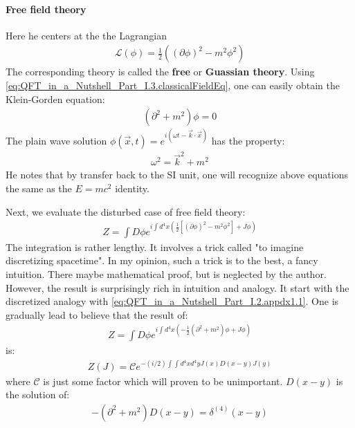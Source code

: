 \documentclass{book}
\numberwithin{equation}{subsection} %
\theoremstyle{definition}
\begin{document}
\paragraph{Free field theory}

Here he centers at the the Lagrangian
\begin{align}
    \mathcal{L}(\phi)=\frac{1}{2}\left( (\partial\phi)^2-m^2\phi^2\right)
\end{align}
The corresponding theory is called the \textbf{free} or 
\textbf{Guassian theory}. Using 
\ref{eq:QFT_in_a_Nutshell_Part_I.3.classicalFieldEq}, one can easily
obtain the Klein-Gorden equation:
\begin{align}
    (\partial^2+m^2)\phi=0
\end{align}
The plain wave solution 
    $\phi(\vec{x},t)=e^{i(\omega t-\vec{k}\cdot\vec{x})}$ 
has the property:
\begin{align}
    \omega^2=\vec{k}^2+m^2
\end{align}
He notes that by transfer back to the SI unit, one will
recognize above equations the same as the $E=mc^2$ identity.

Next, we evaluate the disturbed case of free field theory:
\begin{align}
    Z = \int D\phi e^{i\int d^4x \left( \frac{1}{2} 
        [(\partial\phi)^2-m^2\phi^2]+J\phi \right)
        }
\end{align}
The integration is rather lengthy. It involves a trick called
"to imagine discretizing spacetime". In my opinion, such a trick
is to the best, a fancy intuition. There maybe mathematical proof,
but is neglected by the author. However, the result is surprisingly
rich in intuition and analogy. It start with the discretized
analogy with \eqref{eq:QFT_in_a_Nutshell_Part_I.2.appdx1.1}. One
is gradually lead to believe that the result of:
\begin{align}
    Z = \int D\phi e^{ i\int d^4x 
        \left(-\frac{1}{2}(\partial^2+m^2)\phi+J\phi \right)}
\end{align}
is:
\begin{align}
    \label{eq:QFT_in_a_Nutshell_Part_I.3.3}
    Z(J) = \mathcal{C}e^{-(i/2) \int\int d^4xd^4y J(x)D(x-y)J(y)}
\end{align}
where $\mathcal{C}$ is just some factor which will proven to be
unimportant. $D(x-y)$ is the solution of:
\begin{align}
    \label{eq:QFT_in_a_Nutshell_Part_I.3.2}
    -(\partial^2+m^2)D(x-y)=\delta^{(4)}(x-y)
\end{align}
\end{document}

